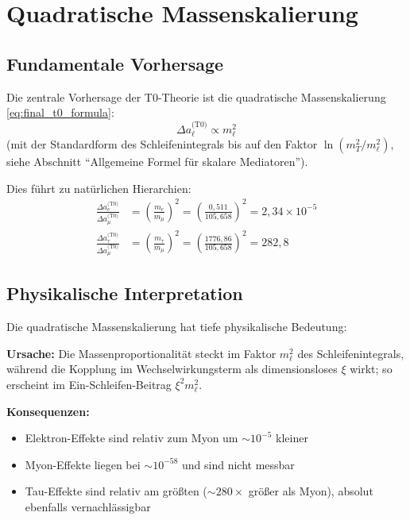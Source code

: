 	\section{Quadratische Massenskalierung}
	
	\subsection{Fundamentale Vorhersage}
	
	Die zentrale Vorhersage der T0-Theorie ist die quadratische Massenskalierung \eqref{eq:final_t0_formula}:
	\begin{equation}
		\Delta a_\ell^{\text{(T0)}} \propto m_\ell^2
		\label{eq:quadratic_scaling}
	\end{equation}
	(mit der Standardform des Schleifenintegrals bis auf den Faktor $\ln(m_T^2/m_\ell^2)$, siehe Abschnitt \enquote{Allgemeine Formel für skalare Mediatoren}).
	
	Dies führt zu natürlichen Hierarchien:
	\begin{align}
		\frac{\Delta a_e^{\text{(T0)}}}{\Delta a_\mu^{\text{(T0)}}} 
		&= \left(\frac{m_e}{m_\mu}\right)^2 
		= \left(\frac{0{,}511}{105{,}658}\right)^2 
		= 2{,}34 \times 10^{-5} \label{eq:electron_muon_ratio} \\
		\frac{\Delta a_\tau^{\text{(T0)}}}{\Delta a_\mu^{\text{(T0)}}} 
		&= \left(\frac{m_\tau}{m_\mu}\right)^2 
		= \left(\frac{1776{,}86}{105{,}658}\right)^2 
		= 282{,}8 \label{eq:tau_muon_ratio}
	\end{align}
	
	\subsection{Physikalische Interpretation}
	
	Die quadratische Massenskalierung hat tiefe physikalische Bedeutung:
	
	\textbf{Ursache:} Die Massenproportionalität steckt im Faktor $m_\ell^2$ des Schleifenintegrals, während die Kopplung im Wechselwirkungsterm als dimensionsloses $\xi$ wirkt; so erscheint im Ein-Schleifen-Beitrag $\xi^2 m_\ell^2$.
	
	\textbf{Konsequenzen:}
	\begin{itemize}
		\item Elektron-Effekte sind relativ zum Myon um $\sim 10^{-5}$ kleiner
		\item Myon-Effekte liegen bei $\sim 10^{-58}$ und sind nicht messbar
		\item Tau-Effekte sind relativ am größten ($\sim 280 \times$ größer als Myon), absolut ebenfalls vernachlässigbar
	\end{itemize}
	
